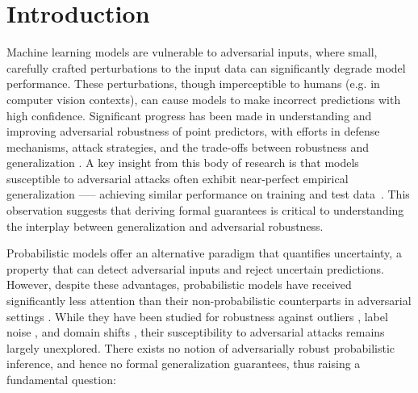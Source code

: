 \section{Introduction}
\label{sec:intro}
Machine learning models are vulnerable to adversarial inputs, where small, carefully crafted perturbations to the input data can significantly degrade model performance. 
These perturbations, though imperceptible to humans (e.g. in computer vision contexts), can cause models to make incorrect predictions with high confidence. 
Significant progress has been made in understanding and improving adversarial robustness of point predictors, with efforts in defense mechanisms, attack strategies, and the trade-offs between robustness and generalization \citep{szegedy2013intriguing, shhafahi2019are, li2023adersarial}. 
A key insight from this body of research is that models  susceptible to adversarial attacks often exhibit near-perfect empirical generalization --— achieving similar performance on training and test data~\citep{goodfellow2014explaining}.%
This observation suggests that deriving formal guarantees is critical to understanding the interplay between generalization and adversarial robustness. %


Probabilistic models %
offer an alternative paradigm that quantifies uncertainty, a property that can detect adversarial inputs and reject uncertain predictions. 
However, despite these advantages, probabilistic models have received significantly less attention than their non-probabilistic counterparts in adversarial settings \citep{bradshaw2017adversarial, grosse2018limitations}. 
While they have been studied for robustness against outliers \citep{kim2008outlier}, label noise \citep{hernandez2011robust}, and domain shifts \citep{ovadia2019can}, their susceptibility to adversarial attacks remains largely unexplored. 
There exists no notion of adversarially robust probabilistic inference, and hence no formal generalization guarantees,
thus raising a fundamental question:

